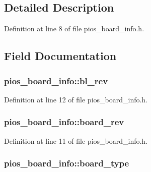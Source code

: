 \subsection{Detailed Description}


Definition at line 8 of file pios\-\_\-board\-\_\-info.\-h.



\subsection{Field Documentation}
\hypertarget{structpios__board__info_ab862f6bf9209684556e24b7e7cd014f7}{
\subsubsection[{bl\-\_\-rev}]{ pios\-\_\-board\-\_\-info\-::bl\-\_\-rev}}\label{structpios__board__info_ab862f6bf9209684556e24b7e7cd014f7}


Definition at line 12 of file pios\-\_\-board\-\_\-info.\-h.

\hypertarget{structpios__board__info_a7c5ba691095b534927e3f0b6cc7202d6}{
\subsubsection[{board\-\_\-rev}]{ pios\-\_\-board\-\_\-info\-::board\-\_\-rev}}\label{structpios__board__info_a7c5ba691095b534927e3f0b6cc7202d6}


Definition at line 11 of file pios\-\_\-board\-\_\-info.\-h.

\hypertarget{structpios__board__info_a5aff4607db694a6885c0ce5361afa9bb}{
\subsubsection[{board\-\_\-type}]{ pios\-\_\-board\-\_\-info\-::board\-\_\-type}}\label{structpios__board__info_a5aff4607db694a6885c0ce5361afa9bb}


